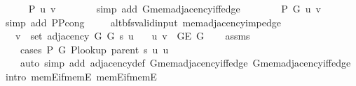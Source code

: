 \begin{isabellebody}
\ \ \ \ \isamarkupfalse%
\ {\isachardoublequoteopen}P{\isacharprime}{\kern0pt}{\isacharprime}{\kern0pt}\ {\isacharbraceleft}{\kern0pt}u{\isacharcomma}{\kern0pt}\ v{\isacharbraceright}{\kern0pt}{\isachardoublequoteclose}\isanewline
\ \ \ \ \ \ \isamarkupfalse%
\ {\isacharparenleft}{\kern0pt}simp\ add{\isacharcolon}{\kern0pt}\ G{}{\isachardot}{\kern0pt}mem{\isacharunderscore}{\kern0pt}adjacency{\isacharunderscore}{\kern0pt}iff{\isacharunderscore}{\kern0pt}edge{\isacharparenright}{\kern0pt}\isanewline
\ \ \ \ \isamarkupfalse%
\ {\isachardoublequoteopen}{\isasymnot}\ {\isasymnot}\ P\ G{}\ u\ v{\isachardoublequoteclose}\isanewline
\ \ \ \ \ \ \isamarkupfalse%
\ {\isacharparenleft}{\kern0pt}simp\ add{\isacharcolon}{\kern0pt}\ P{\isacharunderscore}{\kern0pt}P{\isacharprime}{\kern0pt}{\isacharprime}{\kern0pt}{\isacharunderscore}{\kern0pt}cong{\isacharparenright}{\kern0pt}\isanewline
\ \ \isamarkupfalse%
\isanewline
{}\isamarkupfalse%
%
\endisatagproof
{\isafoldproof}%
%
\isadelimproof
\isanewline
%
\endisadelimproof
\isanewline
{}\isamarkupfalse%
\ {\isacharparenleft}{\kern0pt}\ alt{\isacharunderscore}{\kern0pt}bfs{\isacharunderscore}{\kern0pt}valid{\isacharunderscore}{\kern0pt}input{\isacharparenright}{\kern0pt}\ mem{\isacharunderscore}{\kern0pt}adjacency{\isacharunderscore}{\kern0pt}imp{\isacharunderscore}{\kern0pt}edge{\isacharcolon}{\kern0pt}\isanewline
\ \ \ {\isachardoublequoteopen}v\ {\isasymin}\ set\ {\isacharparenleft}{\kern0pt}adjacency\ G{}\ G{}\ s\ u{\isacharparenright}{\kern0pt}{\isachardoublequoteclose}\isanewline
\ \ \ {\isachardoublequoteopen}{\isacharbraceleft}{\kern0pt}u{\isacharcomma}{\kern0pt}\ v{\isacharbraceright}{\kern0pt}\ {\isasymin}\ G{\isachardot}{\kern0pt}E\ G{\isachardoublequoteclose}\isanewline
%
\isadelimproof
\ \ %
\endisadelimproof
%
\isatagproof
{}\isamarkupfalse%
\ assms\isanewline
\ \ \isamarkupfalse%
\isanewline
\ \ \ \ {\isacharparenleft}{\kern0pt}cases\ {\isachardoublequoteopen}P{\isacharprime}{\kern0pt}\ G{}\ {\isacharparenleft}{\kern0pt}P{\isacharunderscore}{\kern0pt}lookup\ {\isacharparenleft}{\kern0pt}parent\ s{\isacharparenright}{\kern0pt}\ u{\isacharparenright}{\kern0pt}\ u{\isachardoublequoteclose}{\isacharparenright}{\kern0pt}\isanewline
\ \ \ \ {\isacharparenleft}{\kern0pt}auto\ simp\ add{\isacharcolon}{\kern0pt}\ adjacency{\isacharunderscore}{\kern0pt}def\ G{}{\isachardot}{\kern0pt}mem{\isacharunderscore}{\kern0pt}adjacency{\isacharunderscore}{\kern0pt}iff{\isacharunderscore}{\kern0pt}edge\ G{}{\isachardot}{\kern0pt}mem{\isacharunderscore}{\kern0pt}adjacency{\isacharunderscore}{\kern0pt}iff{\isacharunderscore}{\kern0pt}edge\ intro{\isacharcolon}{\kern0pt}\ mem{\isacharunderscore}{\kern0pt}E{\isacharunderscore}{\kern0pt}if{\isacharunderscore}{\kern0pt}mem{\isacharunderscore}{\kern0pt}E{}\ mem{\isacharunderscore}{\kern0pt}E{\isacharunderscore}{\kern0pt}if{\isacharunderscore}{\kern0pt}mem{\isacharunderscore}{\kern0pt}E{}{\isacharparenright}{\kern0pt}%

\end{isabellebody}
